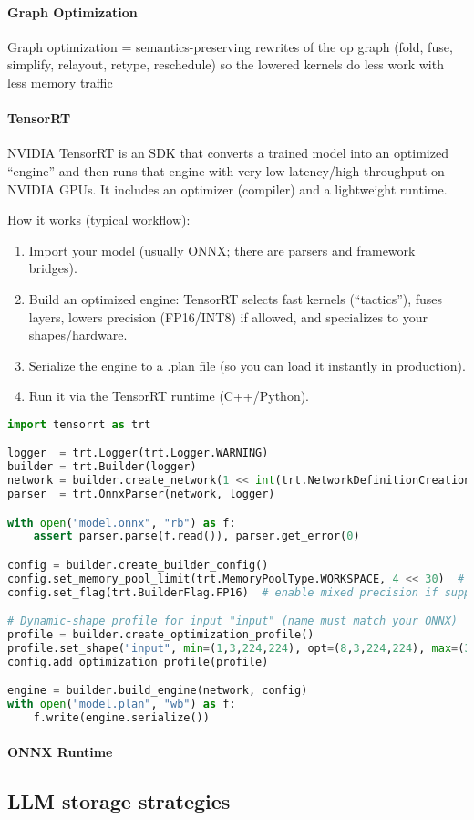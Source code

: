 \paragraph{Graph Optimization}
Graph optimization = semantics-preserving rewrites of the op graph (fold, fuse, simplify, relayout, retype, reschedule) so the lowered kernels do less work with less memory traffic

\paragraph{TensorRT} NVIDIA TensorRT is an SDK that converts a trained model into an optimized ``engine'' and then runs that engine with very low latency/high throughput on NVIDIA GPUs. It includes an optimizer (compiler) and a lightweight runtime.

How it works (typical workflow):
\begin{enumerate}
	\item Import your model (usually ONNX; there are parsers and framework bridges).
	\item Build an optimized engine: TensorRT selects fast kernels (“tactics”), fuses layers, lowers precision (FP16/INT8) if allowed, and specializes to your shapes/hardware.
	\item Serialize the engine to a .plan file (so you can load it instantly in production).
	\item Run it via the TensorRT runtime (C++/Python).
\end{enumerate}

\begin{lstlisting}[language=Python]
import tensorrt as trt

logger  = trt.Logger(trt.Logger.WARNING)
builder = trt.Builder(logger)
network = builder.create_network(1 << int(trt.NetworkDefinitionCreationFlag.EXPLICIT_BATCH))
parser  = trt.OnnxParser(network, logger)

with open("model.onnx", "rb") as f:
    assert parser.parse(f.read()), parser.get_error(0)

config = builder.create_builder_config()
config.set_memory_pool_limit(trt.MemoryPoolType.WORKSPACE, 4 << 30)  # workspace budget
config.set_flag(trt.BuilderFlag.FP16)  # enable mixed precision if supported

# Dynamic-shape profile for input "input" (name must match your ONNX)
profile = builder.create_optimization_profile()
profile.set_shape("input", min=(1,3,224,224), opt=(8,3,224,224), max=(32,3,224,224))
config.add_optimization_profile(profile)

engine = builder.build_engine(network, config)
with open("model.plan", "wb") as f:
    f.write(engine.serialize())
\end{lstlisting}



\paragraph{ONNX Runtime}

\subsection{LLM storage strategies}
